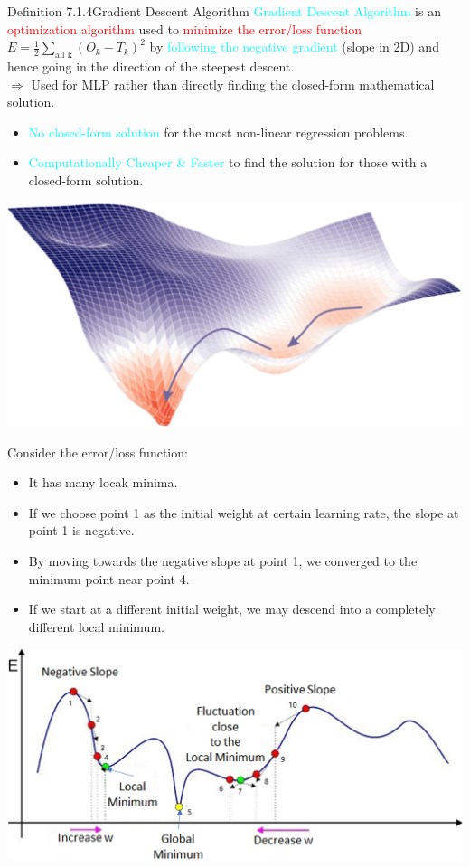 \documentclass{book}
\begin{document}
\begin{defBox}{Definition 7.1.4}{Gradient Descent Algorithm}
    \textcolor{cyan}{Gradient Descent Algorithm} is an \textcolor{red}{optimization algorithm} used to \textcolor{red}{minimize the error/loss function} \(E = \frac{1}{2}\sum_{\text{all k}} (O_k - T_k)^2\) by \textcolor{cyan}{following the negative gradient} (slope in 2D) and hence going in the direction of the steepest descent.\\
    $\Rightarrow$ Used for MLP rather than directly finding the closed-form mathematical solution.
    \begin{itemize}
        \item \textcolor{cyan}{No closed-form solution} for the most non-linear regression problems.
        \item \textcolor{cyan}{Computationally Cheaper \& Faster} to find the solution for those with a closed-form solution.
    \end{itemize}
    \begin{center}
        \includegraphics[scale=0.3]{chapter 7/ch7_figure3.jpeg}
    \end{center}
\end{defBox}
Consider the error/loss function:
\begin{itemize}
    \item It has many locak minima.
    \item If we choose point 1 as the initial weight at certain learning rate, the slope at point 1 is negative.
    \item By moving towards the negative slope at point 1, we converged to the minimum point near point 4.
    \item If we start at a different initial weight, we may descend into a completely different local minimum.
\end{itemize}
\begin{center}
    \includegraphics[scale=0.26]{chapter 7/ch7_figure4.jpeg}
\end{center}
\end{document}
